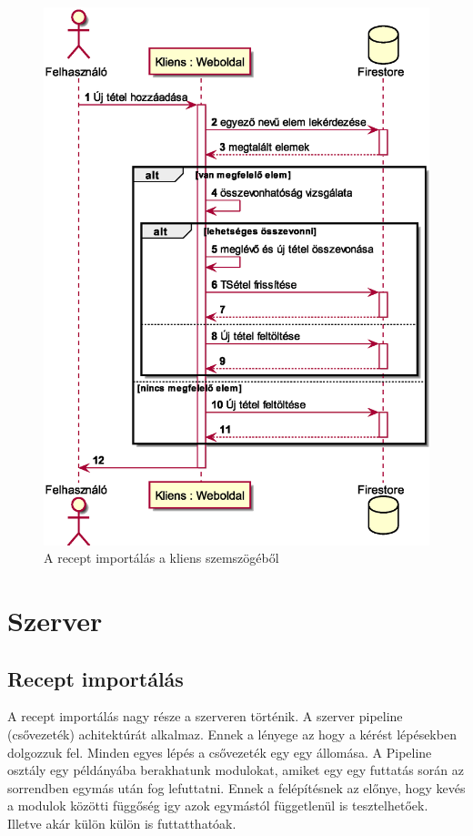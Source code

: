 \documentclass[12pt]{report}
\theoremstyle{definition}
\begin{document}
\noindent
\begin{figure}[H]
	\centering
	\includegraphics[width=.8\textwidth]{out/diagrams/clientShoppingListAdd/clientShoppingListAdd.eps}
	\caption{A recept importálás a kliens szemszögéből}
    \label{fig:clientShoppingListAdd}
\end{figure}

\section{Szerver}

\subsection{Recept importálás}
\label{serverImportsRecipe}
A recept importálás nagy része a szerveren történik. A szerver pipeline (csővezeték) achitektúrát alkalmaz.
Ennek a lényege az hogy a kérést lépésekben dolgozzuk fel. Minden egyes lépés a csővezeték egy egy állomása.
A Pipeline osztály egy példányába berakhatunk modulokat, amiket egy egy futtatás során az sorrendben egymás után fog lefuttatni.
Ennek a felépítésnek az előnye, hogy kevés a modulok közötti függőség igy azok egymástól függetlenül is tesztelhetőek.
Illetve akár külön külön is futtatthatóak. 
\end{document}
